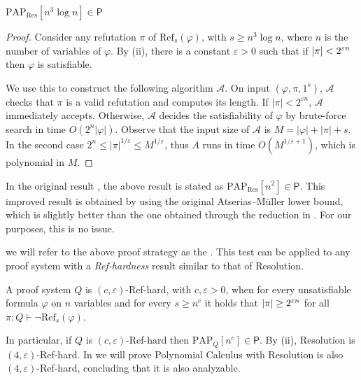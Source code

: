 \begin{proposition}
    \label{prop:res_analyz}
    $\mathrm{PAP}_{\mathrm{Res}}[n^3 \log n] \in \mathsf{P}$
\end{proposition}

\begin{proof}
    Consider any refutation $\pi$ of $\mathrm{Ref}_{s}(\varphi)$, with $s \geq n^3 \log n$, where $n$ is the number of variables of $\varphi$. By (ii), there is a constant $\varepsilon > 0$ such that if $\left|\pi\right| < 2^{\varepsilon n}$ then $\varphi$ is satisfiable.
    
    We use this to construct the following algorithm $\mathcal{A}$. On input $(\varphi, \pi, 1^s)$, $\mathcal{A}$ checks that $\pi$ is a valid refutation and computes its length. If $|\pi| < 2^{\varepsilon n}$, $\mathcal{A}$ immediately accepts. Otherwise, $\mathcal{A}$ decides the satisfiability of $\varphi$ by brute-force search in time $O(2^n |\varphi|)$. Observe that the input size of $\mathcal{A}$ is $M = |\varphi| + |\pi| + s$. In the second case $2^n \leq |\pi|^{1/\varepsilon} \leq M^{1/\varepsilon}$, thus $A$ runs in time $O(M^{1/\varepsilon + 1})$, which is polynomial in $M$.
\end{proof}

\begin{observation}
    In the original result \cite{pap}, the above result is stated as $\mathrm{PAP}_{\mathrm{Res}}[n^2] \in \mathsf{P}$. This improved result is obtained by using the original Atserias--Müller lower bound, which is slightly better than the one obtained through the reduction in . For our purposes, this is no issue.
\end{observation}

we will refer to the above proof strategy as the . This test can be applied to any proof system with a \textit{Ref-hardness} result similar to that of Resolution.

\begin{definition}
   A proof system $Q$ is $(c, \varepsilon)$-Ref-hard, with $c, \varepsilon > 0$, when for every unsatisfiable formula $\varphi$ on $n$ variables and for every $s \geq n^c$ it holds that $\left|\pi\right| \geq 2^{\varepsilon n}$ for all $\pi : Q \vdash \lnot \mathrm{Ref}_s(\varphi)$.
\end{definition}

In particular, if $Q$ is $(c, \varepsilon)$-Ref-hard then $\mathrm{PAP}_Q[n^c] \in \mathsf{P}$. By (ii), Resolution is $(4,\varepsilon)$-Ref-hard. In  we will prove Polynomial Calculus with Resolution is also $(4,\varepsilon)$-Ref-hard, concluding that it is also analyzable.

